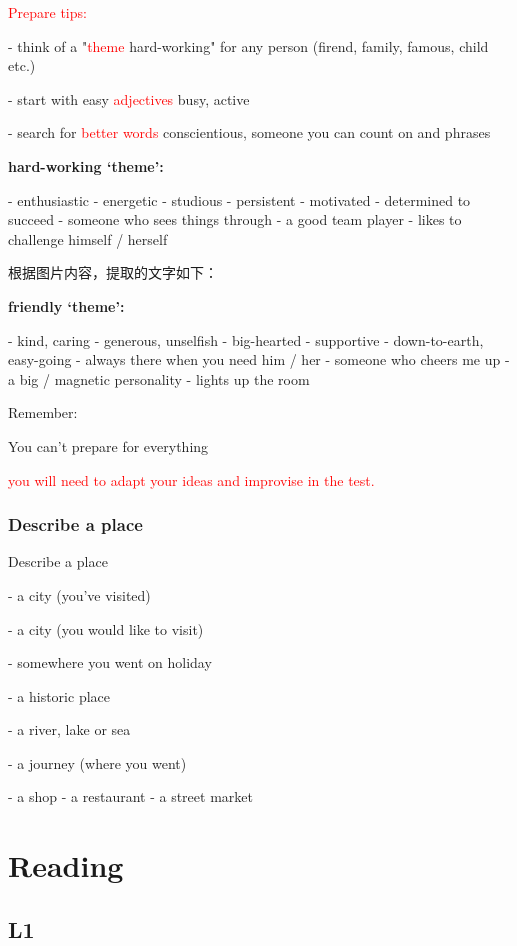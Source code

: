 \documentclass[12pt,a4paper]{article}
\newcommand{\textred}[1]{\textcolor{red}{#1}}  %
\begin{document}
\textred{Prepare tips:}

- think of a "\textred{theme} {\footnotesize hard-working}" for any person 
(firend, family, famous, child etc.)

- start with easy \textred{adjectives} {\footnotesize busy, active}

- search for \textred{better words} {\footnotesize conscientious, someone you can count on} and phrases

\vspace{0.54cm}
\textbf{hard-working ‘theme’:}

- enthusiastic  
- energetic  
- studious  
- persistent  
- motivated  
- determined to succeed  
- someone who sees things through  
- a good team player  
- likes to challenge himself / herself

根据图片内容，提取的文字如下：

\textbf{friendly ‘theme’:}

- kind, caring
- generous, unselfish
- big-hearted
- supportive
- down-to-earth, easy-going
- always there when you need him / her
- someone who cheers me up
- a big / magnetic personality
- lights up the room

Remember: 

You can't prepare for everything

\textred{you will need to adapt your ideas and improvise in the test.}

\subsubsection*{Describe a place}

Describe a place

- a city (you’ve visited)  

- a city (you would like to visit)  

- somewhere you went on holiday  

- a historic place  

- a river, lake or sea  

- a journey (where you went)  


- a shop  
- a restaurant  
- a street market



\newpage
\section*{Reading}
\subsection*{L1}
\end{document}
